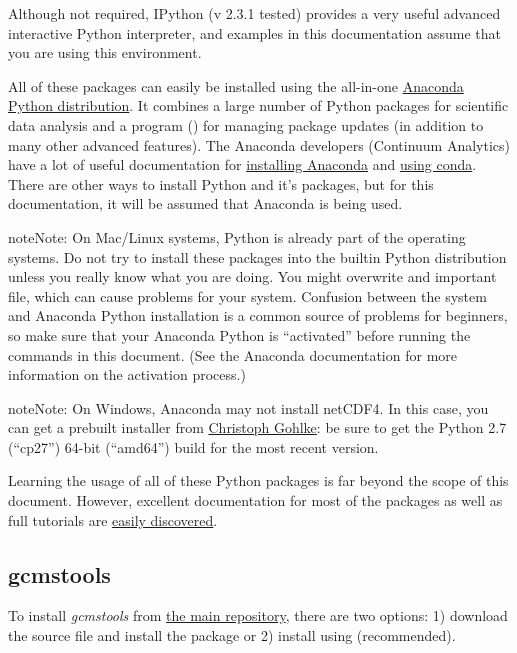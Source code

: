 \documentclass[letterpaper,10pt,english]{sphinxmanual}
\begin{document}
Although not required, IPython (v 2.3.1 tested) provides a very useful
advanced interactive Python interpreter, and examples in this documentation
assume that you are using this environment.

All of these packages can easily be installed using the all-in-one \href{http://continuum.io/downloads}{Anaconda
Python distribution}. It combines a large number of Python packages for
scientific data analysis and a program () for managing package
updates (in addition to many other advanced features). The Anaconda developers
(Continuum Analytics) have a lot of useful documentation for \href{http://docs.continuum.io/anaconda/}{installing
Anaconda} and \href{http://conda.pydata.org/docs/}{using conda}. There are other ways to install Python and it's
packages, but for this documentation, it will be assumed that Anaconda is
being used.

\begin{notice}{note}{Note:}
On Mac/Linux systems, Python is already part of the operating systems.  Do
not try to install these packages into the builtin Python distribution
unless you really know what you are doing. You might overwrite and
important file, which can cause problems for your system.  Confusion
between the system and Anaconda Python installation is a common source of
problems for beginners, so make sure that your Anaconda Python is
``activated'' before running the commands in this document. (See the
Anaconda documentation for more information on the activation process.)
\end{notice}

\begin{notice}{note}{Note:}
On Windows, Anaconda may not install netCDF4. In this case, you can get a
prebuilt installer from \href{http://www.lfd.uci.edu/~gohlke/pythonlibs/}{Christoph Gohlke}: be sure to get the Python 2.7
(``cp27'') 64-bit (``amd64'') build for the most recent version.
\end{notice}

Learning the usage of all of these Python packages is far beyond the scope of
this document. However, excellent documentation for most of the packages as
well as full tutorials are \href{https://google.com}{easily discovered}.


\subsection{gcmstools}
\label{intro:gcmstools}\label{intro:easily-discovered}
To install \emph{gcmstools} from \href{https://github.com/rnelsonchem/gcms\_nnls}{the main repository}, there are two options: 1)
download the source file and install the package or 2) install using 
(recommended).
\end{document}
